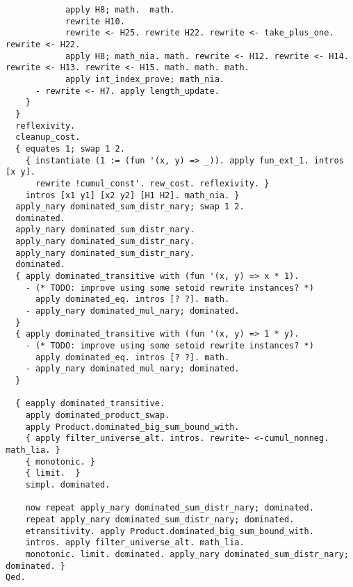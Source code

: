 \begin{verbatim}
            apply H8; math.  math. 
            rewrite H10. 
            rewrite <- H25. rewrite H22. rewrite <- take_plus_one. rewrite <- H22. 
            apply H8; math_nia. math. rewrite <- H12. rewrite <- H14. rewrite <- H13. rewrite <- H15. math. math. math. 
            apply int_index_prove; math_nia. 
      - rewrite <- H7. apply length_update. 
    }
  }
  reflexivity. 
  cleanup_cost. 
  { equates 1; swap 1 2.
    { instantiate (1 := (fun '(x, y) => _)). apply fun_ext_1. intros [x y].
      rewrite !cumul_const'. rew_cost. reflexivity. }
    intros [x1 y1] [x2 y2] [H1 H2]. math_nia. }
  apply_nary dominated_sum_distr_nary; swap 1 2.
  dominated. 
  apply_nary dominated_sum_distr_nary.
  apply_nary dominated_sum_distr_nary.
  apply_nary dominated_sum_distr_nary.
  dominated. 
  { apply dominated_transitive with (fun '(x, y) => x * 1).
    - (* TODO: improve using some setoid rewrite instances? *)
      apply dominated_eq. intros [? ?]. math.
    - apply_nary dominated_mul_nary; dominated. 
  }
  { apply dominated_transitive with (fun '(x, y) => 1 * y).
    - (* TODO: improve using some setoid rewrite instances? *)
      apply dominated_eq. intros [? ?]. math.
    - apply_nary dominated_mul_nary; dominated. 
  }

  { eapply dominated_transitive.
    apply dominated_product_swap.
    apply Product.dominated_big_sum_bound_with.
    { apply filter_universe_alt. intros. rewrite~ <-cumul_nonneg. math_lia. }
    { monotonic. }
    { limit.  }
    simpl. dominated.

    now repeat apply_nary dominated_sum_distr_nary; dominated.
    repeat apply_nary dominated_sum_distr_nary; dominated.
    etransitivity. apply Product.dominated_big_sum_bound_with. 
    intros. apply filter_universe_alt. math_lia. 
    monotonic. limit. dominated. apply_nary dominated_sum_distr_nary; dominated. } 
Qed.

  \end{verbatim}